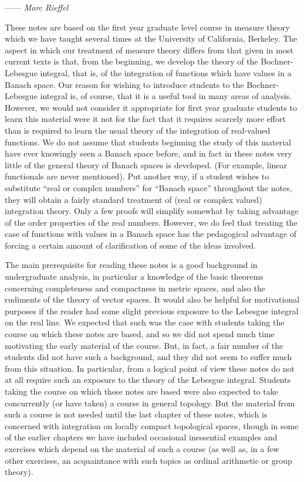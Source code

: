 
\hspace*{0pt}\hfill------ {\it Marc Rieffel}

These notes are based on the first year graduate level course in measure theory which we have taught several times at the University of California, Berkeley. The aspect in which our treatment of measure theory differs from that given in most current texts is that, from the beginning, we develop the theory of the Bochner-Lebesgue integral, that is, of the integration of functions which have values in a Banach space. Our reason for wishing to introduce students to the Bochner-Lebesgue integral is, of course, that it is a useful tool in many areas of analysis. However, we would not consider it appropriate for first year graduate students to learn this material were it not for the fact that it requires scarcely more effort than is required to learn the usual theory of the integration of real-valued functions. We do not assume that students beginning the study of this material have ever knowingly seen a Banach space before, and in fact in these notes very little of the general theory of Banach spaces is developed. (For example, linear functionals are never mentioned). Put another way, if a student wishes to substitute ``real or complex numbers'' for ``Banach space'' throughout the notes, they will obtain a fairly standard treatment of (real or complex valued) integration theory. Only a few proofs will simplify somewhat by taking advantage of the order properties of the real numbers. However, we do feel that treating the case of functions with values in a Banach space has the pedagogical advantage of forcing a certain amount of clarification of some of the ideas involved.

The main prerequisite for reading these notes is a good background in undergraduate analysis, in particular a knowledge of the basic theorems concerning completeness and compactness in metric spaces, and also the rudiments of the theory of vector spaces. It would also be helpful for motivational purposes if the reader had some slight previous exposure to the Lebesgue integral on the real line. We expected that such was the case with students taking the course on which these notes are based, and so we did not spend much time motivating the early material of the course. But, in fact, a fair number of the students did not have such a background, and they did not seem to suffer much from this situation. In particular, from a logical point of view these notes do not at all require such an exposure to the theory of the Lebesgue integral. Students taking the course on which these notes are based were also expected to take concurrently (or have taken) a course in general topology. But the material from such a course is not needed until the last chapter of these notes, which is concerned with integration on locally compact topological spaces, though in some of the earlier chapters we have included occasional inessential examples and exercises which depend on the material of such a course (as well as, in a few other exercises, an acquaintance with such topics as ordinal arithmetic or group theory).

